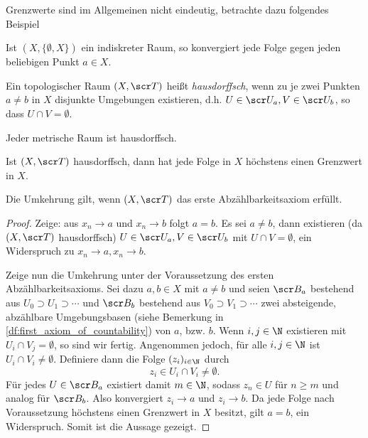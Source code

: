 Grenzwerte sind im Allgemeinen nicht eindeutig, betrachte dazu folgendes Beispiel

\begin{ex}
	Ist $(X, \{\emptyset, X\})$ ein indiskreter Raum, so konvergiert jede Folge gegen jeden beliebigen Punkt $a \in X$.
\end{ex}

\begin{df}
	Ein topologischer Raum $(X, \scr T)$ heißt \emph{hausdorffsch}, wenn zu je zwei Punkten $a \neq b$ in $X$ disjunkte Umgebungen existieren, d.h. $U \in \scr U_a, V \in \scr U_b$, so dass $U \cap V = \emptyset$.
\end{df}

\begin{ex}
	Jeder metrische Raum ist hausdorffsch.
\end{ex}

\begin{st}
	Ist $(X,\scr T)$ hausdorffsch, dann hat jede Folge in $X$ höchstens einen Grenzwert in $X$.

	Die Umkehrung gilt, wenn $(X, \scr T)$ das erste Abzählbarkeitsaxiom erfüllt.
	\begin{proof}
		Zeige: aus $x_n \to a$ und $x_n \to b$ folgt $a = b$.
		Es sei $a \neq b$, dann existieren (da $(X, \scr T)$ hausdorffsch) $U \in \scr U_a, V \in \scr U_b$ mit $U \cap V = \emptyset$, ein Widerspruch zu $x_n \to a, x_n \to b$.

		Zeige nun die Umkehrung unter der Voraussetzung des ersten Abzählbarkeitsaxioms.
		Sei dazu $a, b \in X$ mit $a \neq b$ und seien $\scr B_a$ bestehend aus $U_0 \supset U_1 \supset \dotsb$ und $\scr B_b$ bestehend aus $V_0 \supset V_1 \supset \dotsb$ zwei absteigende, abzählbare Umgebungsbasen (siehe Bemerkung in \ref{df:first_axiom_of_countability}) von $a$, bzw. $b$.
		Wenn $i,j \in \N$ existieren mit $U_i \cap V_j = \emptyset$, so sind wir fertig.
		Angenommen jedoch, für alle $i,j \in \N$ ist $U_i \cap V_i \neq \emptyset$.
		Definiere dann die Folge $(z_i)_{i\in\N}$ durch
		\[
			z_i \in U_i \cap V_i \neq \emptyset.
		\]
		Für jedes $U \in \scr B_a$ existiert damit $m \in \N$, sodass $z_n \in U$ für $n \ge m$ und analog für $\scr B_b$.
		Also konvergiert $z_i \to a$ und $z_i \to b$.
		Da jede Folge nach Voraussetzung höchstens einen Grenzwert in $X$ besitzt, gilt $a = b$, ein Widerspruch.
		Somit ist die Aussage gezeigt.
	\end{proof}
\end{st}


